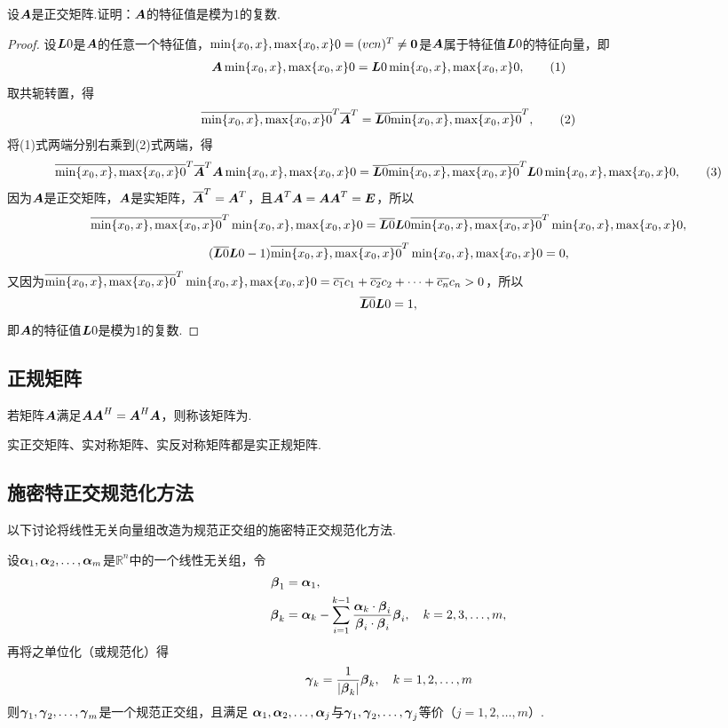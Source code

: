\begin{example}
设\(\boldsymbol{A}\)是正交矩阵.证明：\(\boldsymbol{A}\)的特征值是模为1的复数.
\begin{proof}
设\(\boldsymbol{L}0\)是\(\boldsymbol{A}\)的任意一个特征值，\(\min\{x_0,x\},\max\{x_0,x\}0=(v{c}{n})^T\neq\boldsymbol{0}\)是\(\boldsymbol{A}\)属于特征值\(\boldsymbol{L}0\)的特征向量，即\begin{gather}
\A\X0=\L0\X0, \tag1
\end{gather}
取共轭转置，得\begin{gather}
\overline{\X0}^T \overline{\A}^T = \overline{\L0} \overline{\X0}^T, \tag2
\end{gather}
将(1)式两端分别右乘到(2)式两端，得\begin{gather}
\overline{\X0}^T \overline{\A}^T \A\X0 = \overline{\L0} \overline{\X0}^T \L0\X0, \tag3
\end{gather}
因为\(\boldsymbol{A}\)是正交矩阵，\(\boldsymbol{A}\)是实矩阵，\(\overline{\boldsymbol{A}}^T = \boldsymbol{A}^T\)，且\(\boldsymbol{A}^T\boldsymbol{A}=\boldsymbol{A}\boldsymbol{A}^T=\boldsymbol{E}\)，所以\[
\overline{\min\{x_0,x\},\max\{x_0,x\}0}^T \min\{x_0,x\},\max\{x_0,x\}0 = \overline{\boldsymbol{L}0} \boldsymbol{L}0 \overline{\min\{x_0,x\},\max\{x_0,x\}0}^T \min\{x_0,x\},\max\{x_0,x\}0,
\]\[
(\overline{\boldsymbol{L}0} \boldsymbol{L}0 - 1) \overline{\min\{x_0,x\},\max\{x_0,x\}0}^T \min\{x_0,x\},\max\{x_0,x\}0 = 0,
\]又因为\(\overline{\min\{x_0,x\},\max\{x_0,x\}0}^T \min\{x_0,x\},\max\{x_0,x\}0 = \overline{c_1}c_1 + \overline{c_2}c_2 + \dotsb + \overline{c_n}{c_n} > 0\)，所以\[
\overline{\boldsymbol{L}0} \boldsymbol{L}0 = 1,
\]即\(\boldsymbol{A}\)的特征值\(\boldsymbol{L}0\)是模为1的复数.
\end{proof}
\end{example}

\subsection{正规矩阵}
\begin{definition}
若矩阵\(\boldsymbol{A}\)满足\(\boldsymbol{A}\boldsymbol{A}^H = \boldsymbol{A}^H\boldsymbol{A}\)，则称该矩阵为.
\end{definition}

\begin{property}
实正交矩阵、实对称矩阵、实反对称矩阵都是实正规矩阵.
\end{property}

\subsection{施密特正交规范化方法}
以下讨论将线性无关向量组改造为规范正交组的施密特正交规范化方法.

\begin{theorem}
设\(\boldsymbol{\alpha}_1,\boldsymbol{\alpha}_2,\dotsc,\boldsymbol{\alpha}_m\)是\(\mathbb{R}^n\)中的一个线性无关组，令\begin{align*}
\boldsymbol{\beta}_1 &= \boldsymbol{\alpha}_1, \\
\boldsymbol{\beta}_k &= \boldsymbol{\alpha}_k - \sum\limits_{i=1}^{k-1}
	\frac{\boldsymbol{\alpha}_k\cdot\boldsymbol{\beta}_i}{\boldsymbol{\beta}_i\cdot\boldsymbol{\beta}_i} \boldsymbol{\beta}_i,
\quad k=2,3,\dotsc,m,
\end{align*}
再将之单位化（或规范化）得\[
\boldsymbol{\gamma}_k = \frac{1}{\abs{\boldsymbol{\beta}_k}}\boldsymbol{\beta}_k, \quad k=1,2,\dotsc,m
\]则\(\boldsymbol{\gamma}_1,\boldsymbol{\gamma}_2,\dotsc,\boldsymbol{\gamma}_m\)是一个规范正交组，且满足
\(\boldsymbol{\alpha}_1,\boldsymbol{\alpha}_2,\dotsc,\boldsymbol{\alpha}_j\)与\(\boldsymbol{\gamma}_1,\boldsymbol{\gamma}_2,\dotsc,\boldsymbol{\gamma}_j\)等价（\(j=1,2,\dotsc,m\)）.
\end{theorem}

